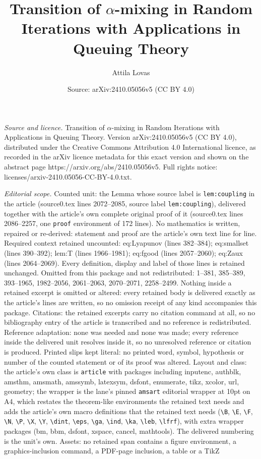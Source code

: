 \documentclass[10pt,a4paper]{amsart}
\title[Transition of $\alpha$-mixing in Random Iterations with Appl]{Transition of $\alpha$-mixing in Random Iterations with Applications in Queuing Theory}
\author{Attila Lovas}
\date{Source: arXiv:2410.05056v5 (CC BY 4.0)}
\begin{document}
\maketitle

\noindent\emph{Source and licence.} Transition of $\alpha$-mixing in Random Iterations with Applications in Queuing Theory. Version arXiv:2410.05056v5 (CC BY 4.0), distributed under the Creative Commons Attribution 4.0 International licence, as recorded in the arXiv licence metadata for this exact version and shown on the abstract page https://arxiv.org/abs/2410.05056v5. Full rights notice: licenses/arxiv-2410.05056-CC-BY-4.0.txt.\par\smallskip

\noindent\textit{Editorial scope.} Counted unit: the Lemma whose source label is \texttt{lem:coupling} in the article (source0.tex lines 2072--2085, source label \texttt{lem:coupling}), delivered together with the article's own complete original proof of it (source0.tex lines 2086--2257, one \texttt{proof} environment of 172 lines). No mathematics is written, repaired or re-derived: statement and proof are the article's own text line for line. Required context retained uncounted: eq:Lyapunov (lines 382--384); eq:smallset (lines 390--392); lem:T (lines 1966--1981); eq:fgood (lines 2057--2060); eq:Zaux (lines 2064--2069). Every definition, display and label of those lines is retained unchanged. Omitted from this package and not redistributed: 1--381, 385--389, 393--1965, 1982--2056, 2061--2063, 2070--2071, 2258--2499. Nothing inside a retained excerpt is omitted or altered: every retained body is delivered exactly as the article's lines are written, so no omission receipt of any kind accompanies this package. Citations: the retained excerpts carry no citation command at all, so no bibliography entry of the article is transcribed and no reference is redistributed. Reference adaptation: none was needed and none was made; every reference inside the delivered unit resolves inside it, so no unresolved reference or citation is produced. Printed slips kept literal: no printed word, symbol, hypothesis or number of the counted statement or of its proof was altered. Layout and class: the article's own class is \texttt{article} with packages including inputenc, authblk, amsthm, amsmath, amssymb, latexsym, dsfont, enumerate, tikz, xcolor, url, geometry; the wrapper is the lane's pinned \texttt{amsart} editorial wrapper at 10pt on A4, which restates the theorem-like environments the retained text needs and adds the article's own macro definitions that the retained text needs (\texttt{\textbackslash B}, \texttt{\textbackslash E}, \texttt{\textbackslash F}, \texttt{\textbackslash N}, \texttt{\textbackslash P}, \texttt{\textbackslash X}, \texttt{\textbackslash Y}, \texttt{\textbackslash dint}, \texttt{\textbackslash eps}, \texttt{\textbackslash ga}, \texttt{\textbackslash ind}, \texttt{\textbackslash ka}, \texttt{\textbackslash leb}, \texttt{\textbackslash lfrf}), with extra wrapper packages (bm, bbm, dsfont, xspace, cancel, mathtools). The delivered numbering is the unit's own. Assets: no retained span contains a figure environment, a graphics-inclusion command, a PDF-page inclusion, a table or a TikZ 
\end{document}
